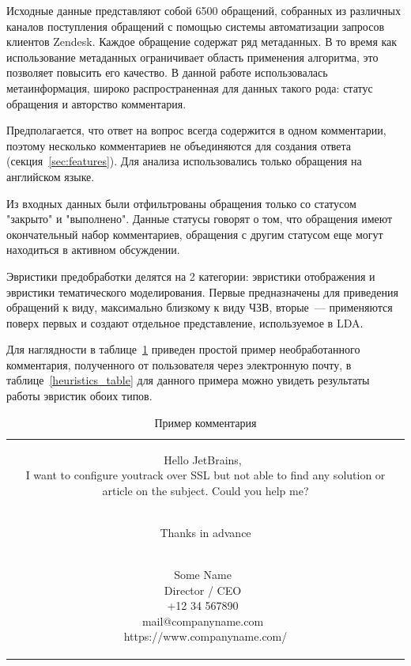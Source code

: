 Исходные данные представляют собой 6500 обращений, собранных из различных каналов поступления обращений с помощью системы автоматизации запросов клиентов Zendesk. Каждое обращение содержат ряд метаданных. В то время как использование метаданных ограничивает область применения алгоритма, это позволяет повысить его качество. В данной работе использовалась метаинформация, широко распространенная для данных такого рода: статус обращения и авторство комментария.

Предполагается, что ответ на вопрос всегда содержится в одном комментарии, поэтому несколько комментариев не объединяются для создания ответа (секция~\ref{sec:features}). Для анализа использовались только обращения на английском языке.

Из входных данных были отфильтрованы обращения только со статусом "закрыто" и "выполнено". Данные статусы говорят о том, что обращения  имеют окончательный набор комментариев, обращения с другим статусом еще могут находиться в активном обсуждении.

Эвристики предобработки делятся на 2 категории: эвристики отображения и эвристики тематического моделирования. Первые предназначены для приведения обращений к виду, максимально близкому к виду ЧЗВ, вторые~--- применяются поверх первых и создают отдельное представление, используемое в LDA.

Для наглядности в таблице~\ref{comment_example} приведен простой пример необработанного комментария, полученного от пользователя через электронную почту, в таблице~\ref{heuristics_table} для данного примера можно увидеть результаты работы эвристик обоих типов.

\begin{table}[!ht]
\caption{Пример комментария}
\label{comment_example}
\centering
\begin{tabular}{|c}
\parbox[t]{8cm}{Hello JetBrains,~\\ 
I want to configure youtrack over SSL but
not able to find any solution or article on the subject. Could you help me?

~\\
Thanks in advance

~\\
Some Name~\\
Director / CEO~\\
+12 34 567890~\\
mail@companyname.com~\\
https://www.companyname.com/} \\
\end{tabular}
\end{table}


